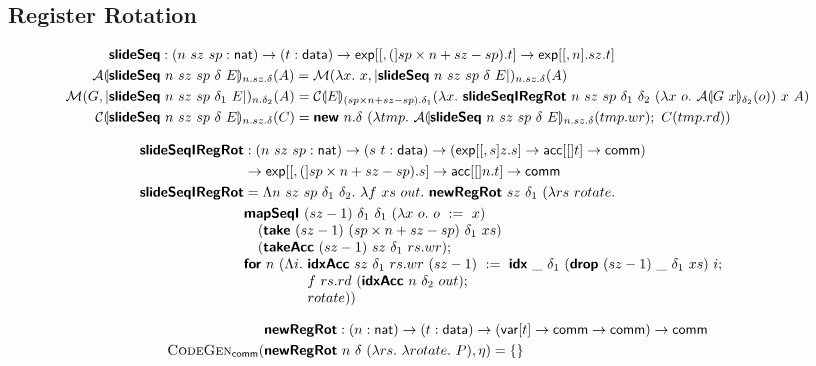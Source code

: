 \subsection{Register Rotation}


{\footnotesize
\begin{align*}
&\bm{\mathsf{slideSeq}} : (n~sz~sp : \mathsf{nat}) \to (t : \mathsf{data}) \to \mathsf{exp}[[, (]sp \times n + sz - sp).t] \to \mathsf{exp}[[, n].sz.t]
\\
\mathcal{A}\llparenthesis &\bm{\mathsf{slideSeq}}~n~sz~sp~\delta~E \rrparenthesis_{n.sz.\delta}(A) = \mathcal{M}(\lambda x.~x, |\bm{\mathsf{slideSeq}}~n~sz~sp~\delta~E|)_{n.sz.\delta}(A)
\\
\mathcal{M}(G, |&\bm{\mathsf{slideSeq}}~n~sz~sp~\delta_1~E|)_{n.\delta_2}(A) = \mathcal{C}\llparenthesis E \rrparenthesis_{(sp \times n + sz - sp).\delta_1}(\lambda x.~\bm{\mathsf{slideSeqIRegRot}}~n~sz~sp~\delta_1~\delta_2~(\lambda x~o.~\mathcal{A}\llparenthesis G~x \rrparenthesis_{\delta_2}(o))~x~A)
\\
\mathcal{C}\llparenthesis &\bm{\mathsf{slideSeq}}~n~sz~sp~\delta~E \rrparenthesis_{n.sz.\delta}(C) = \bm{\mathsf{new}}~n.\delta~(\lambda tmp.~\mathcal{A}\llparenthesis \bm{\mathsf{slideSeq}}~n~sz~sp~\delta~E \rrparenthesis_{n.sz.\delta}(tmp.wr);~C(tmp.rd))
\end{align*}

\begin{align*}
\prim{slideSeqIRegRot} &: (n~sz~sp : \natkind) \to (\dtone~\dttwo : \datatype) \to (\tyexp[sz.\dtone] \to \tyacc[\dttwo] \to \tycomm) \\ &\to \tyexp[(sp \times n + sz - sp).\dtone] \to \tyacc[n.\dttwo] \to \tycomm \\
\prim{slideSeqIRegRot} &= \Lambda n~sz~sp~\delta_1~\delta_2.~\lambda f~xs~out.~\prim{newRegRot}~sz~\delta_1~(\lambda rs~rotate.\\
  &\begin{array}[t]{@{}l}
    \prim{mapSeqI}~(sz - 1)~\delta_1~\delta_1~(\lambda x~o.~o~:=~x) \\
    \quad (\prim{take}~(sz - 1)~(sp \times n + sz - sp)~\delta_1~xs) \\
    \quad (\prim{takeAcc}~(sz - 1)~sz~\delta_1~rs.wr); \\
    \prim{for}~n~(\Lambda i.~
      \begin{array}[t]{@{}l}
        \prim{idxAcc}~sz~\delta_1~rs.wr~(sz - 1)~:=~\prim{idx}~\_~\delta_1~(\prim{drop}~(sz - 1)~\_~\delta_1~xs)~i; \\
        f~rs.rd~(\prim{idxAcc}~n~\delta_2~out); \\
        rotate))
      \end{array}
  \end{array}
\end{align*}

\begin{align*}
&\bm{\mathsf{newRegRot}} : (n : \mathsf{nat}) \to (t : \mathsf{data}) \to (\mathsf{var}[t] \to \mathsf{comm} \to \mathsf{comm}) \to \mathsf{comm}
\\
\textsc{CodeGen}_{\mathsf{comm}}(&\bm{\mathsf{newRegRot}}~n~\delta~(\lambda rs.~\lambda rotate.~P), \eta) = \{\}
\end{align*}
}